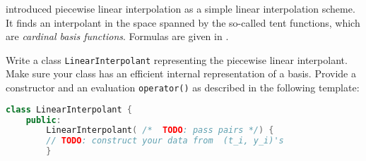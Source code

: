 \begin{problem}
   introduced piecewise linear interpolation as a simple linear
  interpolation scheme. It finds an interpolant in the space spanned by the
  so-called tent functions, which are \emph{cardinal basis functions}. Formulas
  are given in . 


%  
%   
%  
 \begin{subproblem}[3]
  Write a \Cpp{} class \verb|LinearInterpolant| representing the piecewise linear interpolant. Make sure your class has an efficient internal representation of a basis. Provide a constructor and an evaluation \verb|operator()| as described in the following template:
  \begin{lstlisting}[language=c++]
class LinearInterpolant {
    public:
        LinearInterpolant( /*  TODO: pass pairs */) {
	    // TODO: construct your data from  (t_i, y_i)'s
        }
        

\end{lstlisting}
\end{subproblem}
\end{problem}
